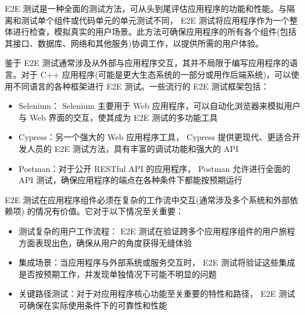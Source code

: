
E2E 测试是一种全面的测试方法，可从头到尾评估应用程序的功能和性能。与隔离和测试单个组件或代码单元的单元测试不同， E2E 测试将应用程序作为一个整体进行检查，模拟真实的用户场景。此方法可确保应用程序的所有各个组件(包括其接口、数据库、网络和其他服务)协调工作，以提供所需的用户体验。


鉴于 E2E 测试通常涉及从外部与应用程序交互，其并不局限于编写应用程序的语言。对于 C++ 应用程序(可能是更大生态系统的一部分或用作后端系统)，可以使用不同语言的各种框架进行 E2E 测试。一些流行的 E2E 测试框架包括：

\begin{itemize}
\item
Selenium： Selenium 主要用于 Web 应用程序，可以自动化浏览器来模拟用户与 Web 界面的交互，使其成为 E2E 测试的多功能工具

\item
Cypress：另一个强大的 Web 应用程序工具， Cypress 提供更现代、更适合开发人员的 E2E 测试方法，具有丰富的调试功能和强大的 API

\item
Postman：对于公开 RESTful API 的应用程序， Postman 允许进行全面的 API 测试，确保应用程序的端点在各种条件下都能按预期运行
\end{itemize}


E2E 测试在应用程序组件必须在复杂的工作流中交互(通常涉及多个系统和外部依赖项) 的情况有价值。它对于以下情况至关重要：

\begin{itemize}
\item
测试复杂的用户工作流程： E2E 测试在验证跨多个应用程序组件的用户旅程方面表现出色，确保从用户的角度获得无缝体验

\item
集成场景：当应用程序与外部系统或服务交互时， E2E 测试将验证这些集成是否按预期工作，并发现单独情况下可能不明显的问题

\item
关键路径测试：对于对应用程序核心功能至关重要的特性和路径， E2E 测试可确保在实际使用条件下的可靠性和性能
\end{itemize}


